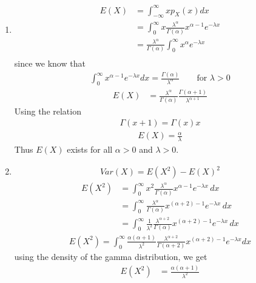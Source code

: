 \documentclass[journal,12pt,twocolumn]{IEEEtran}
\theoremstyle{remark}
\begin{document}
\begin{enumerate}
\item
{
\begin{align}
E(X)&= \int_{-\infty}^{\infty} xp_X(x)dx\\
&= \int_{0}^{\infty} x\frac{\lambda^{\alpha}}{\Gamma(\alpha)}x^{\alpha - 1} e^{-\lambda x}\\
&= \frac{\lambda^{\alpha}}{\Gamma(\alpha)} \int_{0}^{\infty}x^{\alpha} e^{-\lambda x}\\
\end{align}
since we know that 
\begin{align}
\int_0^\infty x^{\alpha - 1} e^{-\lambda x} dx = \frac{\Gamma(\alpha)}{\lambda^{\alpha}} \qquad \textrm{for } \lambda > 0
\end{align}
\begin{align}
E(X)&= \frac{\lambda^{\alpha}}{\Gamma(\alpha)}\frac{\Gamma(\alpha+1)}{\lambda^{\alpha+1}}
\end{align}
Using the relation
\begin{align}
\Gamma(x+1) = \Gamma(x) x
\end{align}
\begin{align}
E(X)=\frac{\alpha}{\lambda}
\end{align}
Thus $E(X)$ exists for all $\alpha > 0 $ and $ \lambda > 0$.
}
\item{
\begin{align}
{Var}(X) = {E}(X^2) - {E}(X)^2 
\end{align}
\begin{align}
{E}(X^2) &= \int_{0}^{\infty} x^2 \frac{{\lambda}^{\alpha}}{\Gamma({\alpha})} x^{{\alpha}-1} e^{-{\lambda}x} \, {d}x \\
&=\int_{0}^{\infty} \frac{{\lambda}^{\alpha}}{\Gamma({\alpha})} x^{({\alpha}+2)-1} e^{-{\lambda}x} \, {d}x \\
&=\int_{0}^{\infty} \frac{1}{{\lambda}^2} \frac{{\lambda}^{{\alpha}+2}}{\Gamma({\alpha})} x^{({\alpha}+2)-1} e^{-{\lambda}x} \, {d}x 
\end{align}
\begin{align}
{E}(X^2) = \int_{0}^{\infty} \frac{{\alpha}({\alpha}+1)}{{\lambda}^2}  \frac{{\lambda}^{{\alpha}+2}}{\Gamma({\alpha}+2)} x^{({\alpha}+2)-1} e^{-{\lambda}x}{d}x
\end{align}
using the density of the gamma distribution, we get
\begin{align}
{E}(X^2) &= \frac{{\alpha}({\alpha}+1)}{{\lambda}^2} 
\end{align}
\begin{align}

\end{align}}
\end{enumerate}
\end{document}
